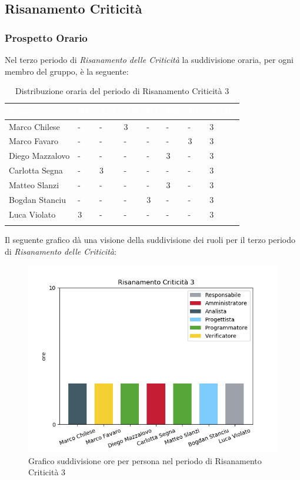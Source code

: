 \newpage
\subsection{Risanamento Criticità}
\label{PRC3}

\subsubsection{Prospetto Orario}
Nel terzo periodo di \textit{Risanamento delle Criticità} la suddivisione oraria, per ogni membro del gruppo, è la seguente:

\begin{longtable}{|C{.30\textwidth}|C{.06\textwidth}|C{.06\textwidth}|C{.06\textwidth} | C{.06\textwidth}| C{.06\textwidth} | C{.06\textwidth} | C{.10\textwidth} |}
\hline
{}	\textbf{\textcolor{white}{Nome}} & \textbf{\textcolor{white}{RE}} & \textbf{\textcolor{white}{AM}} & \textbf{\textcolor{white}{AN}} & \textbf{\textcolor{white}{PJ}} & \textbf{\textcolor{white}{PR}} & \textbf{\textcolor{white}{VE}} & \textbf{\textcolor{white}{Totale}}\\
\hline 
	Marco Chilese & - & - & 3 & - & - & - & 3 \\
	\hline
	Marco Favaro & - & - & - & - & - & 3 & 3 \\
	\hline
	Diego Mazzalovo & - & - & - & - & 3 & - & 3 \\
	\hline
	Carlotta Segna & - & 3 & - & - & - & - & 3 \\
	\hline
	Matteo Slanzi & - & - & - & - & 3 & - & 3 \\
	\hline
	Bogdan Stanciu & - & - & - & 3 & - & - & 3 \\
	\hline
	Luca Violato & 3 & - & - & - & - & - & 3 \\   
	\hline
	
	
	\caption{Distribuzione oraria del periodo di Risanamento Criticità 3}
	\label{Distribuzione oraria rc3}
\end{longtable}

Il seguente grafico dà una visione della suddivisione dei ruoli per il terzo periodo di  \textit{Risanamento delle Criticità}:\begin{figure}[H]
	\centering
	\includegraphics[width=0.8\linewidth]{./images/fig_rc3.png}
	\caption{Grafico suddivisione ore per persona nel periodo di Risanamento Criticità 3}
	\label{fig:grafico ore suddivione ruoli rc3}
\end{figure}


